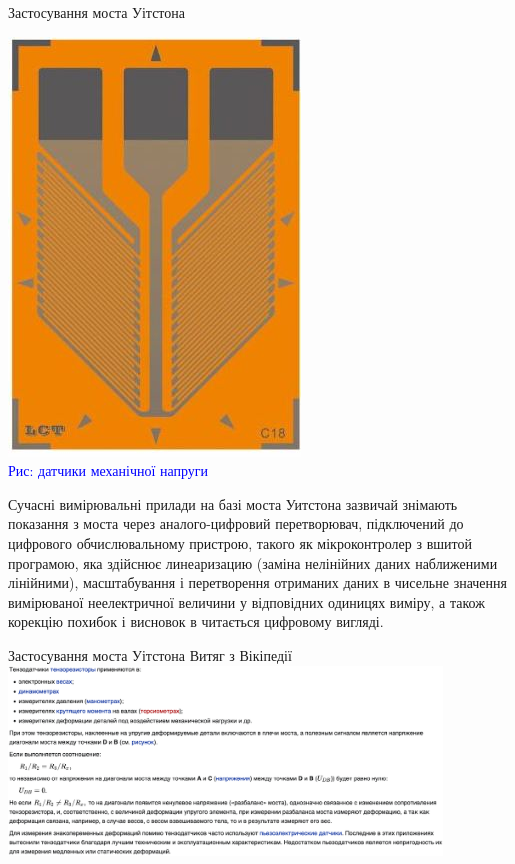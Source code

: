 \documentclass{beamer}
\begin{document}
\begin{frame}{Застосування моста Уітстона}
\begin{center}
\includegraphics[scale=0.3]{dav.jpg}\\ \textcolor{blue}{Рис: датчики механічної напруги}\\
\end{center}
\small
Сучасні вимірювальні прилади на базі моста Уитстона зазвичай знімають показання з моста через аналого-цифровий перетворювач, підключений до цифрового обчислювальному пристрою, такого як мікроконтролер з вшитой програмою, яка здійснює линеаризацию (заміна нелінійних даних наближеними лінійними), масштабування і перетворення отриманих даних в чисельне значення вимірюваної неелектричної величини у відповідних одиницях виміру, а також корекцію похибок і висновок в читається цифровому вигляді.
\end{frame}
  
  
  
  
  \begin{frame}{Застосування моста Уітстона}
\center Витяг з Вікіпедії
\includegraphics[width=11.5cm, heigh=12cm]{viki.png}\\ 
\hfill
\small

\end{frame}
  
\end{document}
